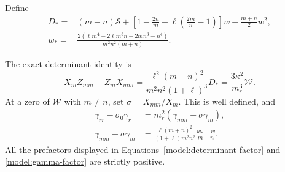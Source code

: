 Define
\begin{align}
 D_*={}&(m-n)\mathcal S
 +\left[1-\frac{2n}{m}
       +\ell\left(\frac{2m}{n}-1\right)\right]w
 +\frac{m+n}{2}w^2,
 \label{model:Dstar}\\
 w_*={}&
 \frac{2(\ell m^4-2\ell m^3n+2mn^3-n^4)}
      {m^2n^2(m+n)}.
 \label{model:wstar}
\end{align}

\begin{lemma}
\label{model:endpoint-algebra}
The exact determinant identity is
\begin{equation}
 X_mZ_{mm}-Z_mX_{mm}
 =\frac{\ell^2(m+n)^2}{m^2n^2(1+\ell)^3}D_*
 =\frac{3\kappa^2}{m_r^3}\mathcal W.
 \label{model:determinant-factor}
\end{equation}
At a zero of \(\mathcal W\) with \(m\ne n\), set
\(\sigma=X_{mm}/X_m\).  This is well defined, and
\begin{align}
 \gamma_{rr}-\sigma_0\gamma_r
 &=m_r^2(\gamma_{mm}-\sigma\gamma_m),
 \label{model:coordinate-zero-sign}\\
 \gamma_{mm}-\sigma\gamma_m
 &=\frac{\ell(m+n)^2}{(1+\ell)m^2n^2}
       \frac{w_*-w}{m-n}.
 \label{model:gamma-factor}
\end{align}
All the prefactors displayed in
Equations~\eqref{model:determinant-factor} and
\eqref{model:gamma-factor} are strictly positive.
\end{lemma}

